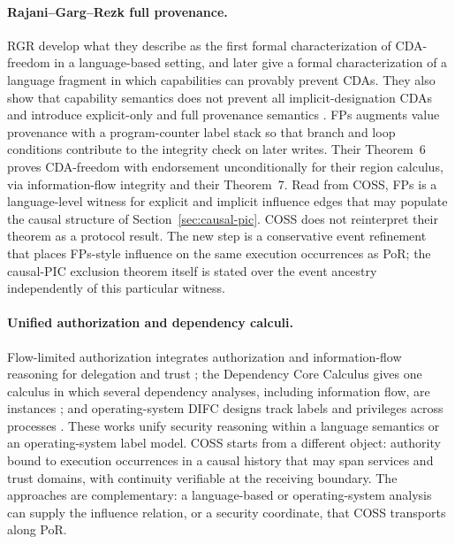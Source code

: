 \documentclass[10pt,twocolumn]{article}
\newcommand{\Model}{\textnormal{\textsc{COSS}}\xspace}
\begin{document}
\paragraph{Rajani--Garg--Rezk full provenance.}
RGR develop what they describe as the first formal characterization of
CDA-freedom in a language-based setting, and later give a formal
characterization of a language fragment in which capabilities can provably
prevent CDAs.  They also show that capability semantics does not prevent all
implicit-designation CDAs and introduce explicit-only and full provenance semantics
\cite{rajani_garg_rezk2016}. FPs augments value provenance with a
program-counter label stack so that branch and loop conditions contribute to
the integrity check on later writes. Their Theorem~6 proves CDA-freedom with
endorsement unconditionally for their region calculus, via information-flow
integrity and their Theorem~7. Read from \Model, FPs is a language-level witness for explicit and implicit
influence edges that may populate the causal structure of Section~\ref{sec:causal-pic}.
\Model does not reinterpret their theorem as a protocol result. The new step is
a conservative event refinement that places FPs-style influence on the same
execution occurrences as PoR; the causal-PIC exclusion theorem itself is stated
over the event ancestry independently of this particular witness.

\paragraph{Unified authorization and dependency calculi.}
Flow-limited authorization integrates authorization and information-flow
reasoning for delegation and trust \cite{arden_liu_myers2015}; the Dependency
Core Calculus gives one calculus in which several dependency analyses,
including information flow, are instances \cite{abadi_dcc1999}; and
operating-system DIFC designs track labels and privileges across processes
\cite{asbestos2005,histar2006,flume2007}. These works unify security reasoning
within a language semantics or an operating-system label model. \Model starts
from a different object: authority bound to execution occurrences in a causal
history that may span services and trust domains, with continuity verifiable
at the receiving boundary. The approaches are complementary: a language-based
or operating-system analysis can supply the influence relation, or a security
coordinate, that \Model transports along PoR.
\end{document}
